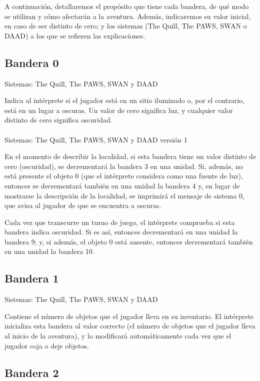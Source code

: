 \documentclass[11pt, a5paper]{article}
\newcommand{\quill}{\textsf{The Quill}\xspace}
\newcommand{\paw}{\textsf{The PAWS}\xspace}
\newcommand{\swan}{\textsf{SWAN}\xspace}
\newcommand{\daad}{\textsf{DAAD}\xspace}
\newcommand{\sistemas}[1]{\noindent Sistemas: #1 \nopagebreak}
\begin{document}
A continuación, detallaremos el propósito que tiene cada bandera, de qué modo se utilizan y cómo afectarán a la aventura. Además, indicaremos su valor inicial, en caso de ser distinto de cero; y los sistemas (\quill, \paw, \swan o \daad) a los que se refieren las explicaciones.

\subsection{Bandera 0}

\sistemas{\quill, \paw, \swan y \daad}

Indica al intérprete si el jugador está en un sitio iluminado o, por el contrario, está en un lugar a oscuras. Un valor de cero significa luz, y cualquier valor distinto de cero significa oscuridad.
\\\ \\
\sistemas{\quill, \paw, \swan y \daad versión 1}

En el momento de describir la localidad, si esta bandera tiene un valor distinto de cero (oscuridad), se decrementará la bandera 3 en una unidad. Si, además, no está presente el objeto 0 (que el intérprete considera como una fuente de luz), entonces se decrementará también en una unidad la bandera 4 y, en lugar de mostrarse la descripción de la localidad, se imprimirá el mensaje de sistema 0, que avisa al jugador de que se encuentra a oscuras.

Cada vez que transcurre un turno de juego, el intérprete comprueba si esta bandera indica oscuridad. Si es así, entonces decrementará en una unidad la bandera 9; y, si además, el objeto 0 está ausente, entonces decrementará también en una unidad la bandera 10.

\subsection{Bandera 1}\label{flag1}

\sistemas{\quill, \paw, \swan y \daad}

Contiene el número de objetos que el jugador lleva en su inventario. El intérprete inicializa esta bandera al valor correcto (el número de objetos que el jugador lleva al inicio de la aventura), y lo modificará automáticamente cada vez que el jugador coja o deje objetos.

\subsection{Bandera 2}
\end{document}
